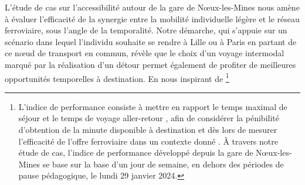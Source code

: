 \begin{refsegment}
L'étude de cas sur l'accessibilité autour de la gare de Nœux-les-Mines nous amène à évaluer l'efficacité de la synergie entre la mobilité individuelle légère et le réseau ferroviaire, sous l'angle de la temporalité. Notre démarche, qui s'appuie sur un scénario dans lequel l'individu souhaite se rendre à Lille ou à Paris en partant de ce nœud de transport en commun, révèle que le choix d'un voyage intermodal marqué par la réalisation d'un détour permet également de profiter de meilleures opportunités temporelles à destination. En nous inspirant de \footnote{
L'indice de performance consiste à mettre en rapport le temps maximal de séjour et le temps de voyage aller-retour \textcolor{blue}{\autocite[]{cauvin_accessibilite_1989}}, afin de considérer la pénibilité d'obtention de la minute disponible à destination et dès lors de mesurer l'efficacité de l'offre ferroviaire dans un contexte donné \textcolor{blue}{\autocite[130]{chapelon_transports_2016}}. À travers notre étude de cas, l'indice de performance développé depuis la gare de Nœux-les-Mines se base sur la base d'un jour de semaine, en dehors des périodes de pause pédagogique, le lundi 29 janvier 2024.
}
\end{refsegment}
